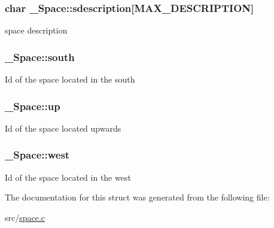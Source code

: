 \subsubsection[{\texorpdfstring{sdescription}{sdescription}}]{\setlength{\rightskip}{0pt plus 5cm}char \+\_\+\+Space\+::sdescription\mbox{[}{\bf M\+A\+X\+\_\+\+D\+E\+S\+C\+R\+I\+P\+T\+I\+ON}\mbox{]}}\hypertarget{struct__Space_af8b371dd53e49a83a287175f0e686245}{}\label{struct__Space_af8b371dd53e49a83a287175f0e686245}
space description 
\subsubsection[{\texorpdfstring{south}{south}}]{ \+\_\+\+Space\+::south}\hypertarget{struct__Space_a646b68c22a0bbf1685033c96109d31d1}{}\label{struct__Space_a646b68c22a0bbf1685033c96109d31d1}
Id of the space located in the south 
\subsubsection[{\texorpdfstring{up}{up}}]{ \+\_\+\+Space\+::up}\hypertarget{struct__Space_af2a50145d93dfb8d82b8b42138dc57a1}{}\label{struct__Space_af2a50145d93dfb8d82b8b42138dc57a1}
Id of the space located upwards 
\subsubsection[{\texorpdfstring{west}{west}}]{ \+\_\+\+Space\+::west}\hypertarget{struct__Space_a20c1d259e93b44e24ba82982e142eb9b}{}\label{struct__Space_a20c1d259e93b44e24ba82982e142eb9b}
Id of the space located in the west 

The documentation for this struct was generated from the following file\+:\begin{DoxyCompactItemize}
\item 
src/\hyperlink{space_8c}{space.\+c}\end{DoxyCompactItemize}
